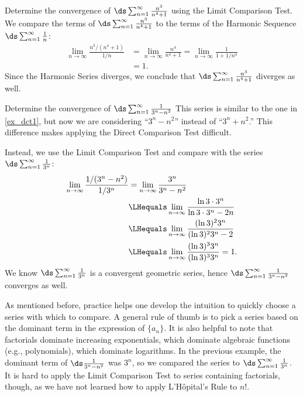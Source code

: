 \begin{example}\label{ex_lct1}
Determine the convergence of $\ds\sum_{n=1}^\infty \frac{n^3}{n^4+1}$ using the Limit Comparison Test.
\solution
We compare the terms of $\ds\sum_{n=1}^\infty \frac{n^3}{n^4+1}$ to the terms of the Harmonic Sequence $\ds\sum_{n=1}^\infty \frac1{n}$:
\begin{align*}
	\lim_{n\to\infty}\frac{{n^3}/(n^4+1)}{1/n}
	&= \lim_{n\to\infty} \frac{n^4}{n^4+1}= \lim_{n\to\infty} \frac{1}{1+1/n^4} \\
	&= 1.
\end{align*}
Since the Harmonic Series diverges, we conclude that $\ds\sum_{n=1}^\infty \frac{n^3}{n^4+1}$ diverges as well.
\end{example}

\begin{example}\label{ex_lct2}
Determine the convergence of $\ds\sum_{n=1}^\infty \frac1{3^n-n^2}$
\solution
This series is similar to the one in \autoref{ex_dct1}, but now we are considering ``$3^n-n^2$'' instead of ``$3^n+n^2$.'' This difference makes applying the Direct Comparison Test difficult.

Instead, we use the Limit Comparison Test and compare with the series $\ds\sum_{n=1}^\infty \frac1{3^n}$:
\begin{align*}
	\lim_{n\to\infty}\frac{1/(3^n-n^2)}{1/3^n}
	&= \lim_{n\to\infty}\frac{3^n}{3^n-n^2} \\
	& \LHequals \lim_{n\to\infty} \frac{\ln 3 \cdot 3^n}{\ln 3 \cdot 3^n -2n}\\
	& \LHequals \lim_{n\to\infty} \frac {(\ln 3)^2 3^n}{(\ln 3)^2 3^n -2}\\
	& \LHequals \lim_{n\to\infty} \frac {(\ln 3)^3 3^n}{(\ln 3)^3 3^n}=1.
\end{align*}
We know $\ds\sum_{n=1}^\infty \frac1{3^n}$ is a convergent geometric series, hence $\ds\sum_{n=1}^\infty \frac1{3^n-n^2}$ converges as well.
\end{example}

As mentioned before, practice helps one develop the intuition to quickly choose a series with which to compare. A general rule of thumb is to pick a series based on the dominant term in the expression of $\{a_n\}$. It is also helpful to note that factorials dominate increasing exponentials, which dominate algebraic functions (e.g., polynomials), which dominate logarithms. In the previous example, the dominant term of $\ds\frac{1}{3^n-n^2}$ was $3^n$, so we compared the series to $\ds \sum_{n=1}^\infty \frac1{3^n}$. It is hard to apply the Limit Comparison Test to series containing factorials, though, as we have not learned how to apply L'Hôpital's Rule to $n!$.

